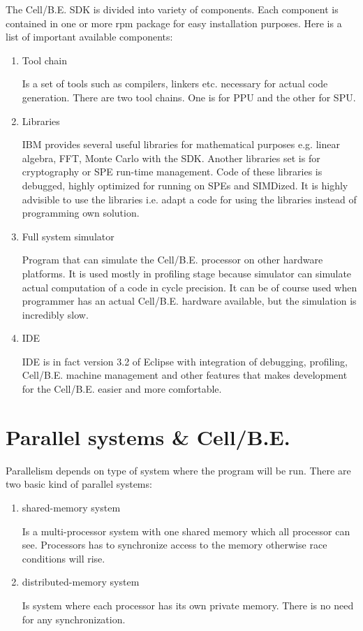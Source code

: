 The \mbox{Cell/B.E.} SDK is divided into variety of components.
Each component is contained in one or more rpm package for easy installation purposes.
Here is a list of important available components:
\begin{enumerate}
  \item {Tool chain}
  \par
  Is a set of tools such as compilers, linkers etc. necessary for actual code generation.
There are two tool chains.
One is for PPU and the other for SPU.

  \item {Libraries}
  \par
  IBM provides several useful libraries for mathematical purposes e.g. linear algebra, FFT, Monte Carlo with the SDK.
Another libraries set is for cryptography or SPE run-time management.
Code of these libraries is debugged, highly optimized for running on SPEs and SIMDized.
It is highly advisible to use the libraries i.e. adapt a code for using the libraries instead of programming own solution.\\

  \item {Full system simulator}
  \par
  Program that can simulate the \mbox{Cell/B.E.} processor on other hardware platforms.
It is used mostly in profiling stage because simulator can simulate actual computation of a code in cycle precision.
It can be of course used when programmer has an actual \mbox{Cell/B.E.} hardware available, but the simulation is incredibly slow.

  \item {IDE}
  \par
  IDE is in fact version 3.2 of Eclipse with integration of debugging, profiling, \mbox{Cell/B.E.} machine management and other features that makes development for the \mbox{Cell/B.E.} easier and more comfortable.
\end{enumerate}


\section{Parallel systems \& \mbox{Cell/B.E.}}

Parallelism depends on type of system where the program will be run.
There are two basic kind of parallel systems:
\begin{enumerate}
\item {shared-memory system}
\par
Is a multi-processor system with one shared memory which all processor can see.
Processors has to synchronize access to the memory otherwise race conditions will rise.

\item {distributed-memory system}
\par
Is system where each processor has its own private memory.
There is no need for any synchronization.
\end{enumerate}


